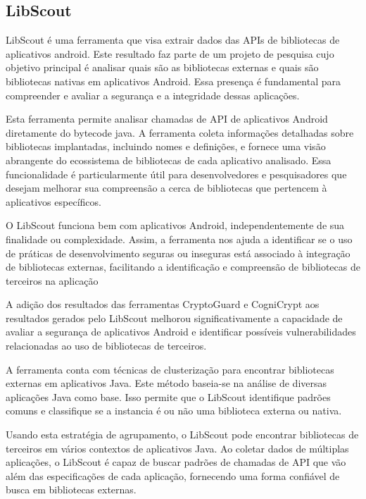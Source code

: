 \subsection{LibScout} %

LibScout é uma ferramenta que visa extrair dados das APIs de bibliotecas de aplicativos android. Este resultado faz parte de um projeto de pesquisa cujo objetivo principal é analisar quais são as bibliotecas externas e quais são bibliotecas nativas em aplicativos Android. Essa presença é fundamental para compreender e avaliar a segurança e a integridade dessas aplicações.

Esta ferramenta permite analisar chamadas de API de aplicativos Android diretamente do bytecode java. A ferramenta coleta informações detalhadas sobre bibliotecas implantadas, incluindo nomes e definições, e fornece uma visão abrangente do ecossistema de bibliotecas de cada aplicativo analisado. Essa funcionalidade é particularmente útil para desenvolvedores e pesquisadores que desejam melhorar sua compreensão a cerca de bibliotecas que pertencem à aplicativos específicos.

O LibScout funciona bem com aplicativos Android, independentemente de sua finalidade ou complexidade. Assim, a ferramenta nos ajuda a identificar se o uso de práticas de desenvolvimento seguras ou inseguras está associado à integração de bibliotecas externas, facilitando a identificação e compreensão de bibliotecas de terceiros na aplicação

A adição dos resultados das ferramentas CryptoGuard e CogniCrypt aos resultados gerados pelo LibScout melhorou significativamente a capacidade de avaliar a segurança de aplicativos Android e identificar possíveis vulnerabilidades relacionadas ao uso de bibliotecas de terceiros.

A ferramenta conta com técnicas de clusterização para encontrar bibliotecas externas em aplicativos Java. Este método baseia-se na análise de diversas aplicações Java como base. Isso permite que o LibScout identifique padrões comuns e classifique se a instancia é ou não uma biblioteca externa ou nativa.

Usando esta estratégia de agrupamento, o LibScout pode encontrar bibliotecas de terceiros em vários contextos de aplicativos Java. Ao coletar dados de múltiplas aplicações, o LibScout é capaz de buscar padrões de chamadas de API que vão além das especificações de cada aplicação, fornecendo uma forma confiável de busca em bibliotecas externas.

